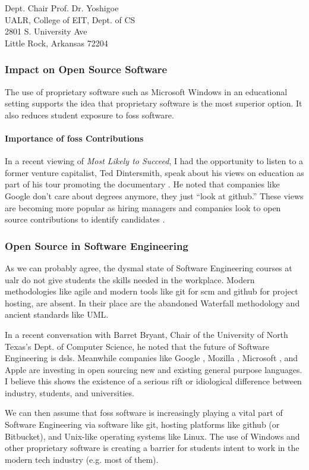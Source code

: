 \documentclass{letter}
\begin{document}
\begin{letter}{
    Dept. Chair Prof. Dr. Yoshigoe \\
    UALR, College of EIT, Dept. of CS \\
    2801 S. University Ave \\
    Little Rock, Arkansas 72204
  }
    \subsubsection{Impact on Open Source Software}

    The use of proprietary software such as Microsoft Windows in an educational setting supports the idea that proprietary software is the most superior option. It also reduces student exposure to \gls{foss} software.

    \paragraph{Importance of \gls{foss} Contributions}

    In a recent viewing of {\it Most Likely to Succeed}, I had the opportunity to listen to a former venture capitalist, Ted Dintersmith, speak about his views on education as part of his tour promoting the documentary \cite{TedDintersmith:HuffPost}. He noted that companies like Google don't care about degrees anymore, they just ``look at \gls{github}.'' These views are becoming more popular as hiring managers and companies look to open source contributions to identify candidates \cite{FOSSHire:PCWorld}.

    \subsubsection{Open Source in Software Engineering}

    As we can probably agree, the dysmal state of Software Engineering courses at \gls{ualr} do not give students the skills needed in the workplace. Modern methodologies like \gls{agile} \cite{Agile:Forbes} and modern tools like \gls{git} for \gls{scm} and \gls{github} for project hosting, are absent. In their place are the abandoned Waterfall methodology and ancient standards like UML.

    In a recent conversation with Barret Bryant, Chair of the University of North Texas's Dept. of Computer Science, he noted that the future of Software Engineering is \glspl{dsl}. Meanwhile companies like Google \cite{Golang}, Mozilla \cite{Rustlang}, Microsoft \cite{NETFOSS:Microsoft}, and Apple \cite{SwiftFOSS:Apple} are investing in open sourcing new and existing general purpose languages. I believe this shows the existence of a serious rift or idiological difference between industry, students, and universities.

    We can then assume that \gls{foss} software is increasingly playing a vital part of Software Engineering via software like \gls{git}, hosting platforms like \gls{github} (or Bitbucket), and Unix-like operating systems like Linux. The use of Windows and other proprietary software is creating a barrier for students intent to work in the modern tech industry (e.g. most of them).


\end{letter}
\end{document}
